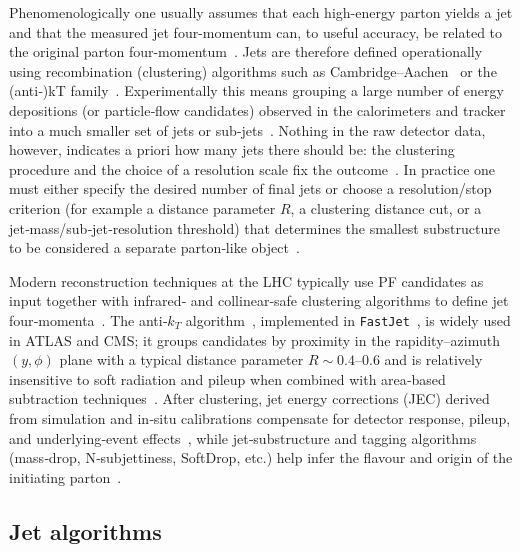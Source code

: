 Phenomenologically one usually assumes that each high-energy parton yields a jet and that the measured jet four-momentum can, to useful accuracy, be related to the original parton four-momentum~\cite{Catani:1993,Ellis:1993}. Jets are therefore defined operationally using recombination (clustering) algorithms such as Cambridge–Aachen~\cite{Dokshitzer:1997} or the (anti‑)kT family~\cite{Cacciari:2008gp}. Experimentally this means grouping a large number of energy depositions (or particle‑flow candidates) observed in the calorimeters and tracker into a much smaller set of jets or sub‑jets~\cite{CMS:PF2017}. Nothing in the raw detector data, however, indicates a priori how many jets there should be: the clustering procedure and the choice of a resolution scale fix the outcome~\cite{Salam:2010}. In practice one must either specify the desired number of final jets or choose a resolution/stop criterion (for example a distance parameter $R$, a clustering distance cut, or a jet‑mass/sub‑jet‑resolution threshold) that determines the smallest substructure to be considered a separate parton‑like object~\cite{Thaler:2011}.

Modern reconstruction techniques at the LHC typically use PF candidates as input together with infrared‑ and collinear‑safe clustering algorithms to define jet four‑momenta~\cite{CMS:PF2017,Cacciari:2011ma}. The anti‑$k_T$ algorithm~\cite{Cacciari:2008gp}, implemented in \texttt{FastJet}~\cite{Cacciari:2011ma}, is widely used in ATLAS and CMS; it groups candidates by proximity in the rapidity–azimuth $(y,\phi)$ plane with a typical distance parameter $R\sim0.4–0.6$ and is relatively insensitive to soft radiation and pileup when combined with area‑based subtraction techniques~\cite{Cacciari:2008area}. After clustering, jet energy corrections (JEC) derived from simulation and in‑situ calibrations compensate for detector response, pileup, and underlying‑event effects~\cite{CMS:JEC}, while jet‑substructure and tagging algorithms (mass‑drop, N‑subjettiness, SoftDrop, etc.) help infer the flavour and origin of the initiating parton~\cite{Butterworth:2008,Thaler:2011,Larkoski:2014}.


\subsection{Jet algorithms}

